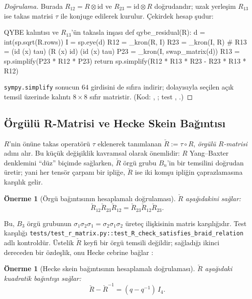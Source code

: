 \documentclass[10pt]{math}
\numberwithin{equation}{section}
\theoremstyle{plain}
\newtheorem{proposition}[theorem]{Önerme}
\theoremstyle{definition}
\newcommand{\id}{\mathrm{id}}
\begin{document}
\begin{proof}[Doğrulama]
Burada $R_{12}=R\otimes\id$ ve $R_{23}=\id\otimes R$ doğrudandır; uzak yerleşim
$R_{13}$ ise takas matrisi $\tau$ ile konjuge edilerek kurulur. Çekirdek
hesap şudur:
\begin{pythoncode}{QYBE kalıntısı ve $R_{13}$'ün takasla inşası}
def qybe_residual(R):
    d = int(sp.sqrt(R.rows))
    I = sp.eye(d)
    R12 = _kron(R, I)
    R23 = _kron(I, R)
    # R13 = (id (x) tau) (R (x) id) (id (x) tau)
    P23 = _kron(I, swap_matrix(d))
    R13 = sp.simplify(P23 * R12 * P23)
    return sp.simplify(R12 * R13 * R23 - R23 * R13 * R12)
\end{pythoncode}
\texttt{sympy.simplify} sonucun $64$ girdisini de sıfıra indirir; dolayısıyla
seçilen açık temsil üzerinde kalıntı $8\times 8$ sıfır matristir. (Kod: ,
; test , .)
\end{proof}

\subsection{Örgülü R-Matrisi ve Hecke Skein Bağıntısı}

$R$'nin önüne takas operatörü $\tau$ eklenerek tanımlanan
$\check R := \tau \circ R$, \emph{örgülü $R$-matrisi} adını alır. Bu küçük
değişiklik kavramsal olarak önemlidir: $R$ Yang--Baxter denklemini ``düz''
biçimde sağlarken, $\check R$ örgü grubu $B_n$'in bir temsilini doğrudan üretir;
yani her tensör çarpanı bir ipliğe, $\check R$ ise iki komşu ipliğin
çaprazlamasına karşılık gelir.

\begin{proposition}[Örgü bağıntısının hesaplamalı doğrulaması]\label{thm:braid}
$\check R$ aşağıdakini sağlar:
\[
  \check R_{12} \check R_{23} \check R_{12} = \check R_{23} \check R_{12} \check R_{23}.
\]
\end{proposition}

Bu, $B_3$ örgü grubunun $\sigma_1\sigma_2\sigma_1 = \sigma_2\sigma_1\sigma_2$
üreteç ilişkisinin matris karşılığıdır. Test karşılığı
\texttt{tests/test\_r\_matrix.py::test\_R\_check\_satisfies\_braid\_relation}
adlı kontroldür. Üstelik $\check R$ keyfi bir örgü temsili değildir; sağladığı
ikinci dereceden bir özdeşlik, onu Hecke cebrine bağlar \cite{Jones,Kassel}:

\begin{proposition}[Hecke skein bağıntısının hesaplamalı doğrulaması]\label{thm:hecke}
$\check R$ aşağıdaki kuadratik bağıntıyı sağlar:
\[
  \check R - \check R^{-1} = (q - q^{-1})\, I_4.
\]
\end{proposition}
\end{document}

